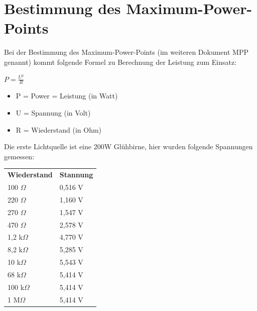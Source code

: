 \documentclass[a4paper,12pt]{article}
\begin{document}
\section{Bestimmung des Maximum-Power-Points}
Bei der Bestimmung des Maximum-Power-Points (im weiteren Dokument MPP genannt) kommt folgende Formel zu Berechnung der Leistung zum Einsatz:\newline
\large \begin{center}
        $P = \frac{U^2}{R}$
       \end{center}
\small \begin{itemize}
    \item P = Power = Leistung (in Watt)
    \item U = Spannung (in Volt)
    \item R = Wiederstand (in Ohm)
\end{itemize} 
\normalsize Die erste Lichtquelle ist eine 200W Glühbirne, hier wurden folgende Spannungen gemessen:\newline
 \begin{tabular}{ll}
  \textbf{Wiederstand} & \textbf{Stannung} \\
  100 $ \Omega $ & 0,516 V \\
  220 $ \Omega $ & 1,160 V \\
  270 $ \Omega $ & 1,547 V \\
  470 $ \Omega $ & 2,578 V \\
  1,2 k$ \Omega $ & 4,770 V \\
  8,2 k$ \Omega $ & 5,285 V \\
  10 k$ \Omega $ & 5,543 V \\
  68 k$ \Omega $ & 5,414 V \\
  100 k$ \Omega $ & 5,414 V \\
  1 M$ \Omega $ & 5,414 V \\
 \end{tabular}
\end{document}
